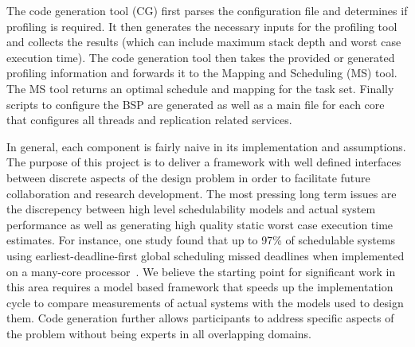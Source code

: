 	The code generation tool (CG) first parses the configuration file and determines if profiling is required. 
	It then generates the necessary inputs for the profiling tool and collects the results (which can include maximum stack depth and worst case execution time). 
	The code generation tool then takes the provided or generated profiling information and forwards it to the Mapping and Scheduling (MS) tool. 
	The MS tool returns an optimal schedule and mapping for the task set. 
	Finally scripts to configure the BSP are generated as well as a main file for each core that configures all threads and replication related services. 	
	
	
	
	In general, each component is fairly naive in its implementation and assumptions. 
	The purpose of this project is to deliver a framework with well defined interfaces between discrete aspects of the design problem in order to facilitate future collaboration and research development. 
	The most pressing long term issues are the discrepency between high level schedulability models and actual system performance as well as generating high quality static worst case execution time estimates.
	For instance, one study found that up to 97\% of schedulable systems using earliest-deadline-first global scheduling missed deadlines when implemented on a many-core processor~\cite{sigrist2015mixed}.
	We believe the starting point for significant work in this area requires a model based framework that speeds up the implementation cycle to compare measurements of actual systems with the models used to design them.
	Code generation further allows participants to address specific aspects of the problem without being experts in all overlapping domains.

